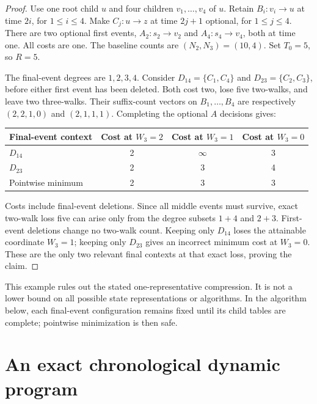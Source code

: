 \documentclass[11pt]{article}
\theoremstyle{remark}
\newcommand{\infv}{\infty}
\begin{document}
\begin{proof}
Use one root child $u$ and four children $v_1,\ldots,v_4$ of $u$.
Retain $B_i:v_i\to u$ at time $2i$, for $1\le i\le4$.
Make $C_j:u\to z$ at time $2j+1$ optional, for $1\le j\le4$.
There are two optional first events, $A_2:s_2\to v_2$ and
$A_4:s_4\to v_4$, both at time one. All costs are one. The baseline counts
are $(N_2,N_3)=(10,4)$. Set $T_0=5$, so $R=5$.

The final-event degrees are $1,2,3,4$. Consider
$D_{14}=\{C_1,C_4\}$ and $D_{23}=\{C_2,C_3\}$, before either first event
has been deleted. Both cost two, lose five two-walks, and leave two
three-walks. Their suffix-count vectors on $B_1,\ldots,B_4$ are respectively
$(2,2,1,0)$ and $(2,1,1,1)$. Completing the optional $A$ decisions gives:
\begin{center}
\begin{tabular}{lccc}
\toprule
Final-event context & Cost at $W_3=2$ & Cost at $W_3=1$ & Cost at $W_3=0$\\
\midrule
$D_{14}$ & 2 & $\infv$ & 3\\
$D_{23}$ & 2 & 3 & 4\\
Pointwise minimum & 2 & 3 & 3\\
\bottomrule
\end{tabular}
\end{center}
Costs include final-event deletions. Since all middle events must survive,
exact two-walk loss five can arise only from the degree subsets $1+4$ and
$2+3$. First-event deletions change no two-walk count. Keeping only $D_{14}$
loses the attainable coordinate $W_3=1$; keeping only $D_{23}$ gives an
incorrect minimum cost at $W_3=0$. These are the only two relevant final
contexts at that exact loss, proving the claim.
\end{proof}

This example rules out the stated one-representative compression. It is not
a lower bound on all possible state representations or algorithms. In the
algorithm below, each final-event configuration remains fixed until its child
tables are complete; pointwise minimization is then safe.

\section{An exact chronological dynamic program}\label{sec:dp}
\end{document}
